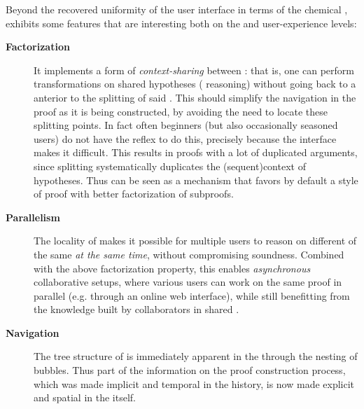 \begin{scope}
Beyond the recovered uniformity of the user interface in terms of the chemical
,  exhibits some features that are interesting both on the
 and user-experience levels:
\begin{description}
  \item[\textbf{Factorization}] It implements a form of \emph{context-sharing}
    between : that is, one can perform transformations on shared
    hypotheses ( reasoning) without going back to a 
    anterior to the splitting of said . This should simplify the
    navigation in the proof as it is being constructed, by avoiding the need to
    locate these splitting points. In fact often beginners (but also
    occasionally seasoned users) do not have the reflex to do this, precisely
    because the interface makes it difficult. This results in proofs with a lot
    of duplicated arguments, since splitting  systematically
    duplicates the \kl(sequent){context} of hypotheses. Thus  can be
    seen as a mechanism that favors by default a style of proof with better
    factorization of subproofs.
  
  \item[\textbf{Parallelism}]
    The locality of  makes it possible for multiple users to
    reason on different  of the same  \emph{at the
    same time}, without compromising soundness. Combined with the above
    factorization property, this enables \emph{asynchronous} collaborative
    setups, where various users can work on the same proof in parallel (e.g.
    through an online web interface), while still benefitting from the knowledge
    built by collaborators in shared .

  \item[\textbf{Navigation}] The tree structure of  is immediately
    apparent in the  through the nesting of bubbles. Thus part of the
    information on the proof construction process, which was made implicit and
    temporal in the  history, is now made explicit and spatial in the
     itself.
    

\end{description}
\end{scope}
